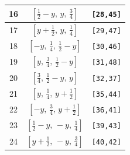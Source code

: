 \documentclass[fleqn,8pt]{jsarticle}
\begin{document}
\begin{longtable}{ccc}
16 & $\left[ \frac{1}{2} - y,\, y,\, \frac{3}{4} \right]$ & {\tt [28,45]} \\ \hline
17 & $\left[ y + \frac{1}{2},\, y,\, \frac{1}{4} \right]$ & {\tt [29,47]} \\ \hline
18 & $\left[ - y,\, \frac{1}{4},\, \frac{1}{2} - y \right]$ & {\tt [30,46]} \\ \hline
19 & $\left[ y,\, \frac{3}{4},\, \frac{1}{2} - y \right]$ & {\tt [31,48]} \\ \hline
20 & $\left[ \frac{3}{4},\, \frac{1}{2} - y,\, y \right]$ & {\tt [32,37]} \\ \hline
21 & $\left[ y,\, \frac{1}{4},\, y + \frac{1}{2} \right]$ & {\tt [35,44]} \\ \hline
22 & $\left[ - y,\, \frac{3}{4},\, y + \frac{1}{2} \right]$ & {\tt [36,41]} \\ \hline
23 & $\left[ \frac{1}{2} - y,\, - y,\, \frac{1}{4} \right]$ & {\tt [39,43]} \\ \hline
24 & $\left[ y + \frac{1}{2},\, - y,\, \frac{3}{4} \right]$ & {\tt [40,42]} \\
\end{longtable}
\renewcommand{\arraystretch}{1.2}
\end{document}
